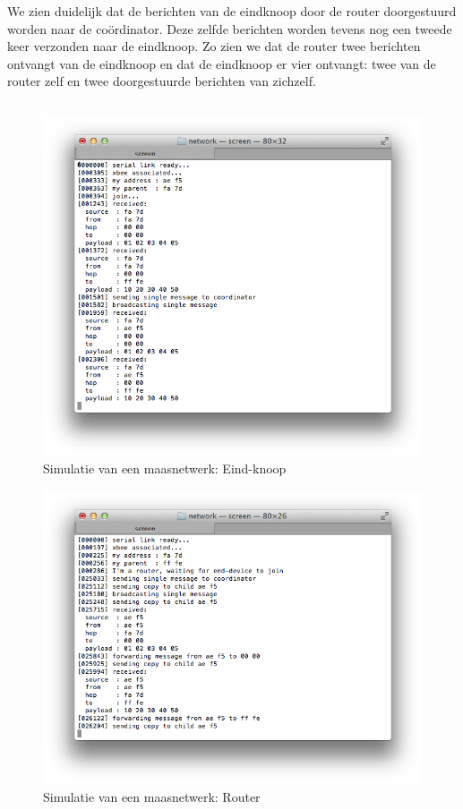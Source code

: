 We zien duidelijk dat de berichten van de eindknoop door de router doorgestuurd
worden naar de co\"ordinator. Deze zelfde berichten worden tevens nog een
tweede keer verzonden naar de eindknoop. Zo zien we dat de router twee
berichten ontvangt van de eindknoop en dat de eindknoop er vier ontvangt: twee
van de router zelf en twee doorgestuurde berichten van zichzelf.

\inputminted[linenos,frame=lines,framesep=2mm,fontsize=\footnotesize,firstline=37,lastline=60,firstnumber=37]{c}{../src/demo/lib/network.c}
\vspace{-5mm}
\vspace{3mm}

\begin{figure}[ht]
  \centering
  \includegraphics[width=.7\linewidth]{../src/demo/network/end-device.png}
  \vspace{-3mm}
  \caption{Simulatie van een maasnetwerk: Eind-knoop}
  \label{fig:virtual-mesh-end-device}
\end{figure}

\begin{figure}[ht]
  \centering
  \includegraphics[width=.7\linewidth]{../src/demo/network/router.png}
  \vspace{-3mm}
  \caption{Simulatie van een maasnetwerk: Router}
  \label{fig:virtual-mesh-router}
\end{figure}

